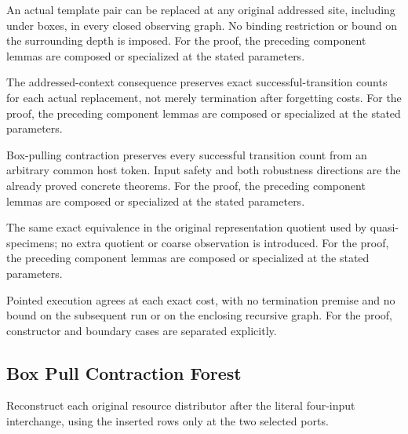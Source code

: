 An actual template pair can be replaced at any original addressed site, including under boxes, in every closed observing graph. No binding restriction or bound on the surrounding depth is imposed.
For the proof, the preceding component lemmas are composed or specialized at the stated parameters.
\par{}

The addressed-context consequence preserves exact successful-transition counts for each actual replacement, not merely termination after forgetting costs.
For the proof, the preceding component lemmas are composed or specialized at the stated parameters.
\par{}

Box-pulling contraction preserves every successful transition count from an arbitrary common host token. Input safety and both robustness directions are the already proved concrete theorems.
For the proof, the preceding component lemmas are composed or specialized at the stated parameters.
\par{}

The same exact equivalence in the original representation quotient used by quasi-specimens; no extra quotient or coarse observation is introduced.
For the proof, the preceding component lemmas are composed or specialized at the stated parameters.
\par{}

Pointed execution agrees at each exact cost, with no termination premise and no bound on the subsequent run or on the enclosing recursive graph.
For the proof, constructor and boundary cases are separated explicitly.
\par{}

\subsection{Box Pull Contraction Forest}
Reconstruct each original resource distributor after the literal four-input interchange, using the inserted rows only at the two selected ports.

